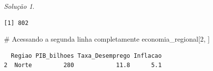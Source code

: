 \documentclass[
  portuguese,
  letterpaper,
  DIV=11,
  numbers=noendperiod]{scrreprt}
\newenvironment{Shaded}{\begin{snugshade}}{\end{snugshade}}
\newcommand{\CommentTok}[1]{\textcolor[rgb]{0.37,0.37,0.37}{#1}}
\newcommand{\DecValTok}[1]{\textcolor[rgb]{0.68,0.00,0.00}{#1}}
\newcommand{\FunctionTok}[1]{\textcolor[rgb]{0.28,0.35,0.67}{#1}}
\newcommand{\NormalTok}[1]{\textcolor[rgb]{0.00,0.23,0.31}{#1}}
\newcommand{\SpecialCharTok}[1]{\textcolor[rgb]{0.37,0.37,0.37}{#1}}
\theoremstyle{definition}
\theoremstyle{remark}
\newtheorem*{solution}{Solução}
\begin{document}
\begin{solution}
\begin{Shaded}
\end{Shaded}

\begin{verbatim}
[1] 802
\end{verbatim}

\begin{Shaded}
\begin{Highlighting}[]
\CommentTok{\# Acessando a segunda linha completamente}
\NormalTok{economia\_regional[}\DecValTok{2}\NormalTok{, ]}
\end{Highlighting}
\end{Shaded}

\begin{verbatim}
  Regiao PIB_bilhoes Taxa_Desemprego Inflacao
2  Norte         280            11.8      5.1
\end{verbatim}

\end{solution}
\end{document}
